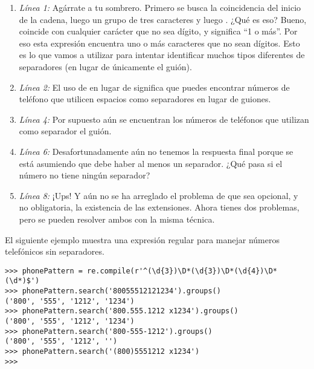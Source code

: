 \begin{enumerate}

\item \emph{Línea 1:} Agárrate a tu sombrero. Primero se busca la coincidencia del inicio de la cadena, luego un grupo de tres caracteres y luego . ¿Qué es eso? Bueno,  coincide con cualquier carácter que no sea dígito, y \codigo{+} significa ``1 o más''. Por eso esta expresión  encuentra uno o más caracteres que no sean dígitos. Esto es lo que vamos a utilizar para intentar identificar muchos tipos diferentes de separadores (en lugar de únicamente el guión).

\item \emph{Línea 2:} El uso de  en lugar de \codigo{-} significa que puedes encontrar números de teléfono que utilicen espacios como separadores en lugar de guiones.

\item \emph{Línea 4:} Por supuesto aún se encuentran los números de teléfonos que utilizan como separador el guión.

\item \emph{Línea 6:} Desafortunadamente aún no tenemos la respuesta final porque se está asumiendo que debe haber al menos un separador. ¿Qué pasa si el número no tiene ningún separador?

\item \emph{Línea 8:} ¡Ups! Y aún no se ha arreglado el problema de que sea opcional, y no obligatoria, la existencia de las extensiones. Ahora tienes dos problemas, pero se pueden resolver ambos con la misma técnica.

\end{enumerate}

El siguiente ejemplo muestra una expresión regular para manejar números telefónicos sin separadores.

\noindent\begin{minipage}{\textwidth}
\begin{lstlisting}[mathescape=False]
>>> phonePattern = re.compile(r'^(\d{3})\D*(\d{3})\D*(\d{4})\D*(\d*)$')
>>> phonePattern.search('80055512121234').groups()
('800', '555', '1212', '1234')
>>> phonePattern.search('800.555.1212 x1234').groups()
('800', '555', '1212', '1234')
>>> phonePattern.search('800-555-1212').groups()
('800', '555', '1212', '')
>>> phonePattern.search('(800)5551212 x1234')
>>> 
\end{lstlisting}
\end{minipage}

